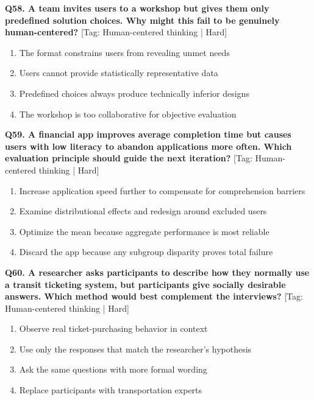 \noindent\textbf{Q58. A team invites users to a workshop but gives them only predefined solution choices. Why might this fail to be genuinely human-centered?} \hfill [Tag: Human-centered thinking | Hard]
\begin{enumerate}[label=(\alph*),topsep=2pt,itemsep=1pt,partopsep=0pt,parsep=0pt]
    \item {The format constrains users from revealing unmet needs}
    \item {Users cannot provide statistically representative data}
    \item {Predefined choices always produce technically inferior designs}
    \item {The workshop is too collaborative for objective evaluation}
\end{enumerate}
\vspace{2mm}

\noindent\textbf{Q59. A financial app improves average completion time but causes users with low literacy to abandon applications more often. Which evaluation principle should guide the next iteration?} \hfill [Tag: Human-centered thinking | Hard]
\begin{enumerate}[label=(\alph*),topsep=2pt,itemsep=1pt,partopsep=0pt,parsep=0pt]
    \item {Increase application speed further to compensate for comprehension barriers}
    \item {Examine distributional effects and redesign around excluded users}
    \item {Optimize the mean because aggregate performance is most reliable}
    \item {Discard the app because any subgroup disparity proves total failure}
\end{enumerate}
\vspace{2mm}

\noindent\textbf{Q60. A researcher asks participants to describe how they normally use a transit ticketing system, but participants give socially desirable answers. Which method would best complement the interviews?} \hfill [Tag: Human-centered thinking | Hard]
\begin{enumerate}[label=(\alph*),topsep=2pt,itemsep=1pt,partopsep=0pt,parsep=0pt]
    \item {Observe real ticket-purchasing behavior in context}
    \item {Use only the responses that match the researcher's hypothesis}
    \item {Ask the same questions with more formal wording}
    \item {Replace participants with transportation experts}
\end{enumerate}
\vspace{2mm}


